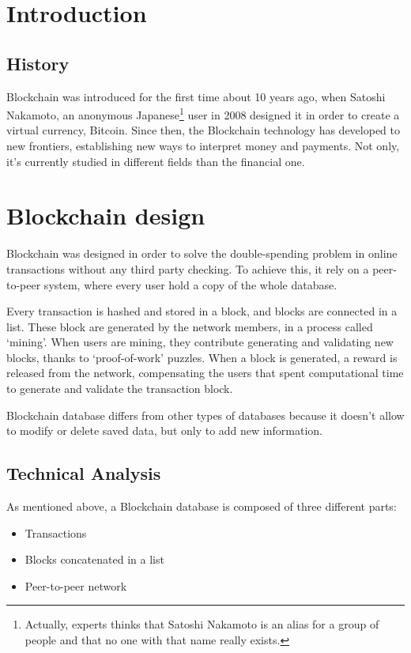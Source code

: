 \section{Introduction}

\subsection{History}
Blockchain was introduced for the first time about 10 years ago, when Satoshi
Nakamoto, an anonymous Japanese\footnote{Actually, experts thinks that Satoshi
Nakamoto is an alias for a group of people and that no one with that name
really exists.} user in 2008 designed it in order to create a virtual currency,
Bitcoin. Since then, the Blockchain technology has developed to new frontiers,
establishing new ways to interpret money and payments. Not only, it's currently
studied in different fields than the financial one.

\section{Blockchain design}
Blockchain was designed in order to solve the double-spending problem in
online transactions without any third party checking\cite{nakamoto08}. To
achieve this, it rely on a peer-to-peer system, where every user hold a copy of
the whole database.

Every transaction is hashed and stored in a block, and blocks are connected in
a list. These block are generated by the network members, in a process called
`mining'. When users are mining, they contribute generating and validating new
blocks, thanks to `proof-of-work' puzzles. When a block is generated, a
reward is released from the network, compensating the users that spent
computational time to generate and validate the transaction block.

Blockchain database differs from other types of databases because it doesn't
allow to modify or delete saved data, but only to add new information.

\subsection{Technical Analysis}

As mentioned above, a Blockchain database is composed of three different
parts\cite{sok15}:
\begin{itemize}
 \item Transactions
 \item Blocks concatenated in a list
 \item Peer-to-peer network
\end{itemize}


